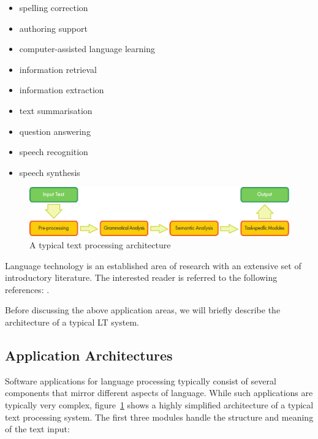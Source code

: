 \begin{multicols}{2}
\begin{itemize}
\item spelling correction
\item authoring support
\item computer-assisted language learning
\item information retrieval 
\item information extraction
\item text summarisation
\item question answering
\item speech recognition 
\item speech synthesis 
\end{itemize}

\begin{figure}[b]
  \center
  \includegraphics[width=\textwidth]{../_media/english/text_processing_app_architecture}
  \caption{A typical text processing architecture}
\label{fig:textprocessingarch_en}
\end{figure}

Language technology is an established area of research with an extensive set of introductory literature. The interested reader is referred to the following references:  \cite{carstensen-etal1, jurafsky-martin01, manning-schuetze1, lt-world1, lt-survey1}.

Before discussing the above application areas, we will briefly describe the architecture of a typical LT system.

\subsection{Application Architectures}

Software applications for language processing typically consist of several components that mirror different aspects of language. While such applications are typically very complex, figure~\ref{fig:textprocessingarch_en} shows a highly simplified architecture of a typical text processing system. The first three modules handle the structure and meaning of the text input:


\end{multicols}
